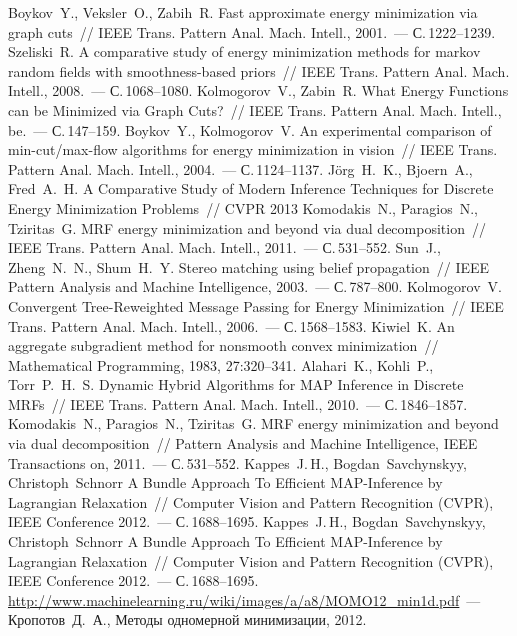 \documentclass{article}
\begin{document}
\begin{thebibliography}{1}
    {Boykov~Y., Veksler~O., Zabih~R.}
    {Fast approximate energy minimization via graph cuts}~//
    {IEEE} Trans. Pattern Anal. Mach. Intell., 2001.~--- С.\,1222--1239.
    {Szeliski~R.}
    {A comparative study of energy minimization methods for markov random fields with smoothness-based priors}~//
    {IEEE} Trans. Pattern Anal. Mach. Intell., 2008.~--- С.\,1068--1080.
    {Kolmogorov~V., Zabin~R.}
    {What Energy Functions can be Minimized via Graph Cuts?}~//
    {IEEE} Trans. Pattern Anal. Mach. Intell., be.~--- С.\,147--159.
    {Boykov~Y., Kolmogorov~V.}
    {An experimental comparison of min-cut/max-flow algorithms for energy minimization in vision}~//
    {IEEE} Trans. Pattern Anal. Mach. Intell., 2004.~--- С.\,1124--1137.
    {Jörg~H.~K., Bjoern~A., Fred~A.~H.}
    {A Comparative Study of Modern Inference Techniques for Discrete Energy Minimization Problems}~//
    CVPR 2013
    {Komodakis~N., Paragios~N., Tziritas~G.}
    {MRF energy minimization and beyond via dual decomposition}~//
    {IEEE} Trans. Pattern Anal. Mach. Intell., 2011.~--- С.\,531--552.
    {Sun~J., Zheng~N.~N., Shum~H.~Y.}
    {Stereo matching using belief propagation}~//
    {IEEE} Pattern Analysis and Machine Intelligence, 2003.~--- С.\,787--800.
    {Kolmogorov~V.}
    {Convergent Tree-Reweighted Message Passing for Energy Minimization}~//
    {IEEE} Trans. Pattern Anal. Mach. Intell., 2006.~--- С.\,1568--1583.
    {Kiwiel~K.}
    {An aggregate subgradient method for nonsmooth convex minimization}~//
    Mathematical Programming, 1983, 27:320--341.
    {Alahari~K., Kohli~P., Torr~P.~H.~S.}
    {Dynamic Hybrid Algorithms for MAP Inference in Discrete MRFs}~//
    {IEEE} Trans. Pattern Anal. Mach. Intell., 2010.~--- С.\,1846--1857.
    {Komodakis~N., Paragios~N., Tziritas~G.}
    {MRF energy minimization and beyond via dual decomposition}~//
    Pattern Analysis and Machine Intelligence, IEEE Transactions on, 2011.~--- С.\,531--552.
    {Kappes~J.\,H., Bogdan~Savchynskyy, Christoph~Schnorr}
    {A Bundle Approach To Efficient MAP-Inference by Lagrangian Relaxation}~//
    Computer Vision and Pattern Recognition (CVPR), IEEE Conference 2012.~--- С.\,1688--1695.
    {Kappes~J.\,H., Bogdan~Savchynskyy, Christoph~Schnorr}
    {A Bundle Approach To Efficient MAP-Inference by Lagrangian Relaxation}~//
    Computer Vision and Pattern Recognition (CVPR), IEEE Conference 2012.~--- С.\,1688--1695.
    \small\url{http://www.machinelearning.ru/wiki/images/a/a8/MOMO12_min1d.pdf}~---
    Кропотов~Д.~А., Методы одномерной минимизации, 2012.
\end{thebibliography}
\end{document}
